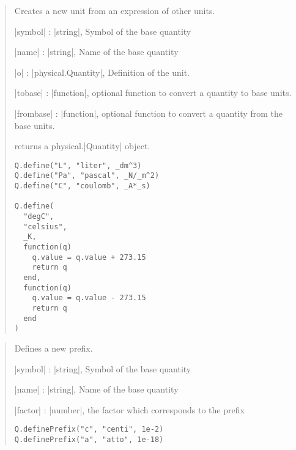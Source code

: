 \documentclass{ltxdoc}
\begin{document}
\begin{quote}
  Creates a new unit from an expression of other units.

  \begin{description}
  \item |symbol| : |string|, Symbol of the base quantity

  \item |name| : |string|, Name of the base quantity

  \item |o| : |physical.Quantity|, Definition of the unit.

  \item |tobase| : |function|, optional function to convert a quantity to base units.

  \item |frombase| : |function|, optional function to convert a quantity from the base units.

  \item returns a physical.|Quantity| object.
  \end{description}


\begin{lstlisting}
Q.define("L", "liter", _dm^3)
Q.define("Pa", "pascal", _N/_m^2)
Q.define("C", "coulomb", _A*_s)

Q.define(
  "degC", 
  "celsius",
  _K, 
  function(q)
    q.value = q.value + 273.15
    return q
  end,
  function(q)
    q.value = q.value - 273.15
    return q
  end
)
\end{lstlisting}
\end{quote}






\begin{quote}
  Defines a new prefix.

  \begin{description}
  \item |symbol| : |string|, Symbol of the base quantity

  \item |name| : |string|, Name of the base quantity

  \item |factor| : |number|, the factor which corresponds to the prefix
  \end{description}


\begin{lstlisting}
Q.definePrefix("c", "centi", 1e-2)
Q.definePrefix("a", "atto", 1e-18)
\end{lstlisting}
\end{quote}
\end{document}
